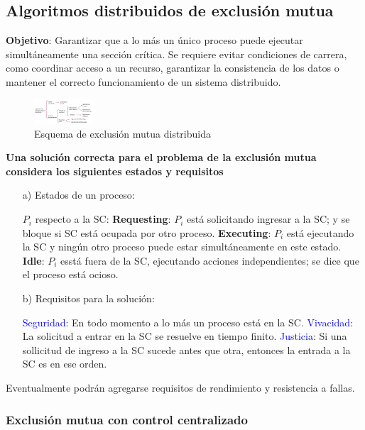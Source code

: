 \subsection{Algoritmos distribuidos de exclusión mutua}

\textbf{Objetivo}: Garantizar que a lo más un único proceso puede ejecutar simultáneamente una sección crítica. Se requiere evitar condiciones de carrera, como coordinar acceso a un recurso, garantizar la consistencia de los datos o mantener el correcto funcionamiento de un sistema distribuido.

\begin{figure}[H]
    \centering
    \includegraphics[width=0.2\textwidth]{img/Clasificacion_algoritmos.png}
    \caption{Esquema de exclusión mutua distribuida}
\end{figure}

\textbf{Una solución correcta para el problema de la exclusión mutua considera los siguientes estados y requisitos}

\begin{itemize}
    \item[a)] Estados de un proceso:
    
    $P_i$ respecto a la SC: \textbf{Requesting}: $P_i$ está solicitando ingresar a la SC; y se bloque si SC está ocupada por otro proceso. \textbf{Executing}: $P_i$ está ejecutando la SC y ningún otro proceso puede estar simultáneamente en este estado. \textbf{Idle}: $P_i$ esstá fuera de la SC, ejecutando acciones independientes; se dice que el proceso está ocioso.

    \item[b)] Requisitos para la solución:
    
    \textcolor{blue}{Seguridad}: En todo momento a lo más un proceso está en la SC. \textcolor{blue}{Vivacidad}: La solicitud a entrar en la SC se resuelve en tiempo finito. \textcolor{blue}{Justicia}: Si una sollicitud de ingreso a la SC sucede antes que otra, entonces la entrada a la SC es en ese orden.
\end{itemize}

Eventualmente podrán agregarse requisitos de rendimiento y resistencia a fallas.

\subsubsection{Exclusión mutua con control centralizado}

